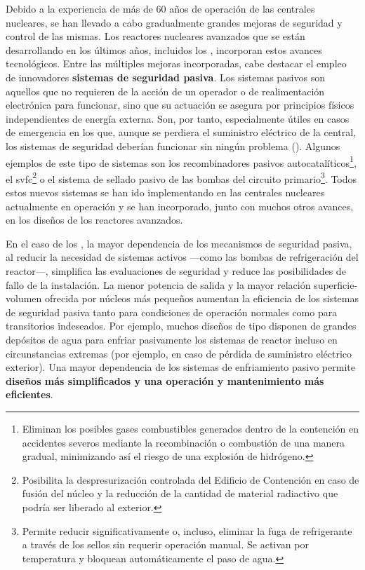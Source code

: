 Debido a la experiencia de más de 60 años de operación de las centrales nucleares, se han llevado a cabo gradualmente grandes mejoras de seguridad y control de las mismas. Los reactores nucleares avanzados que se están desarrollando en los últimos años, incluidos los , incorporan estos avances tecnológicos. Entre las múltiples mejoras incorporadas, cabe destacar el empleo de innovadores \textbf{sistemas de seguridad pasiva}. Los sistemas pasivos son aquellos que no requieren de la acción de un operador o de realimentación electrónica para funcionar, sino que su actuación se asegura por principios físicos independientes de energía externa. Son, por tanto, especialmente útiles en casos de emergencia en los que, aunque se perdiera el suministro eléctrico de la central, los sistemas de seguridad deberían funcionar sin ningún problema (\cite{glosario_seguridad_oiea}). Algunos ejemplos de este tipo de sistemas son los r\gls{ecombinadores pasivos} autocatalíticos\footnote{Eliminan los posibles gases combustibles generados dentro de la contención en accidentes severos mediante la recombinación o combustión de una manera gradual, minimizando así el riesgo de una explosión de hidrógeno.}, el \acrfull{svfc}\footnote{Posibilita la despresurización controlada del Edificio de Contención en caso de fusión del núcleo y la reducción de la cantidad de material radiactivo que podría ser liberado al exterior.} o el sistema de sellado pasivo de las bombas del circuito primario\footnote{Permite reducir significativamente o, incluso, eliminar la fuga de refrigerante a través de los sellos sin requerir operación manual. Se activan por temperatura y bloquean automáticamente
el paso de agua.}. Todos estos nuevos sistemas se han ido implementando en las centrales nucleares actualmente en operación y se han incorporado, junto con muchos otros avances, en los diseños de los reactores avanzados.

En el caso de los , la mayor dependencia de los mecanismos de seguridad pasiva, al reducir la necesidad de sistemas activos ---como las bombas de refrigeración del reactor---, simplifica las evaluaciones de seguridad y reduce las posibilidades de fallo de la instalación. La menor potencia de salida y la mayor relación superficie-volumen ofrecida por núcleos más pequeños aumentan la eficiencia de los sistemas de seguridad pasiva tanto para condiciones de operación normales como para transitorios indeseados. Por ejemplo, muchos diseños de tipo  disponen de grandes depósitos de agua para enfriar pasivamente los sistemas de reactor incluso en circunstancias extremas (por ejemplo, en caso de pérdida de suministro eléctrico exterior). Una mayor dependencia de los sistemas de enfriamiento pasivo permite \textbf{diseños más simplificados y una operación y mantenimiento más eficientes}. 

